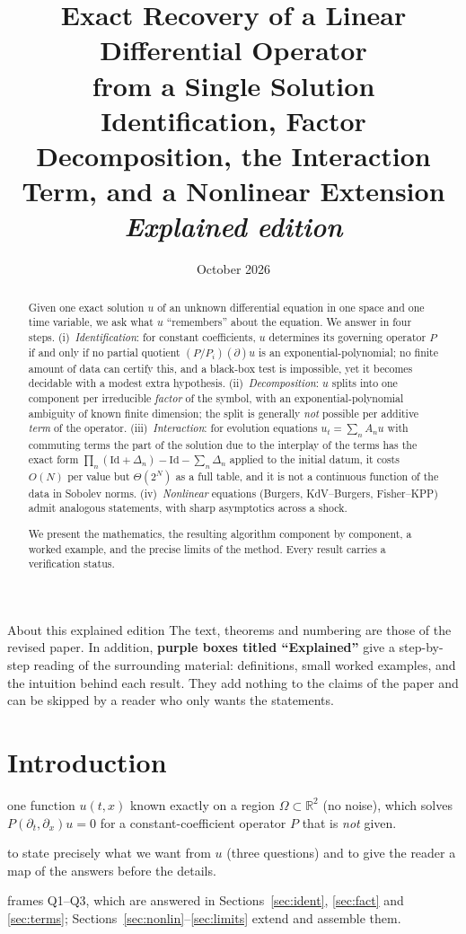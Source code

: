 \documentclass[11pt,a4paper]{article}
\title{\textbf{Exact Recovery of a Linear Differential Operator\\ from a Single Solution}\\[4pt]
\large Identification, Factor Decomposition, the Interaction Term, and a Nonlinear Extension\\[2pt]\normalsize\textit{Explained edition}}
\author{}
\date{October 2026}
\theoremstyle{definition}
\newcommand{\sectionbrief}[3]{\begin{leadin}\begin{description}[nosep,leftmargin=3.0cm,labelwidth=2.8cm]
  \item[Starting from] #1
  \item[Why this section] #2
  \item[Role in the paper] #3
  \end{description}\end{leadin}}
\newcommand{\R}{\mathbb{R}}\newcommand{\C}{\mathbb{C}}\newcommand{\N}{\mathbb{N}}\newcommand{\Z}{\mathbb{Z}}
\newcommand{\Id}{\mathrm{Id}}
\begin{document}
\maketitle

\begin{abstract}
\noindent
Given one exact solution $u$ of an unknown differential equation in one space and one time variable, we ask what $u$ ``remembers'' about the equation. We answer in four steps. (i)~\emph{Identification}: for constant coefficients, $u$ determines its governing operator $P$ if and only if no partial quotient $(P/P_i)(\partial)u$ is an exponential-polynomial; no finite amount of data can certify this, and a black-box test is impossible, yet it becomes decidable with a modest extra hypothesis. (ii)~\emph{Decomposition}: $u$ splits into one component per irreducible \emph{factor} of the symbol, with an exponential-polynomial ambiguity of known finite dimension; the split is generally \emph{not} possible per additive \emph{term} of the operator. (iii)~\emph{Interaction}: for evolution equations $u_t=\sum_nA_nu$ with commuting terms the part of the solution due to the interplay of the terms has the exact form $\prod_n(\Id+\Delta_n)-\Id-\sum_n\Delta_n$ applied to the initial datum, it costs $O(N)$ per value but $\Theta(2^N)$ as a full table, and it is not a continuous function of the data in Sobolev norms. (iv)~\emph{Nonlinear} equations (Burgers, KdV--Burgers, Fisher--KPP) admit analogous statements, with sharp asymptotics across a shock.

\medskip\noindent We present the mathematics, the resulting algorithm component by component, a worked example, and the precise limits of the method. Every result carries a verification status.
\end{abstract}

\tableofcontents

\begin{notebox}{About this explained edition}
The text, theorems and numbering are those of the revised paper. In addition, \textbf{purple boxes titled ``Explained''} give a step-by-step reading of the surrounding material: definitions, small worked examples, and the intuition behind each result. They add nothing to the claims of the paper and can be skipped by a reader who only wants the statements.
\end{notebox}
\bigskip

\section{Introduction}\label{sec:intro}
\sectionbrief
{one function $u(t,x)$ known exactly on a region $\Omega\subset\R^2$ (no noise), which solves $P(\partial_t,\partial_x)u=0$ for a constant-coefficient operator $P$ that is \emph{not} given.}
{to state precisely what we want from $u$ (three questions) and to give the reader a map of the answers before the details.}
{frames Q1--Q3, which are answered in Sections~\ref{sec:ident}, \ref{sec:fact} and \ref{sec:terms}; Sections~\ref{sec:nonlin}--\ref{sec:limits} extend and assemble them.}
\end{document}
